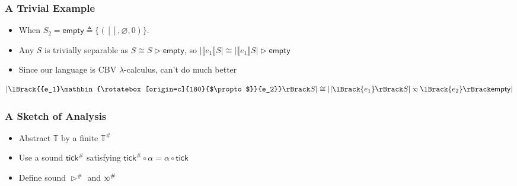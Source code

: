 \documentclass{beamer}
\newcommand*{\A}[1]{{#1}^{\#}}
\newcommand*{\Time}{\mathbb{T}}
\newcommand*{\semlink}{\mathbin{\rotatebox[origin=c]{180}{$\propto$}}}
\newcommand*{\link}[2]{{#1}\semlink{#2}}
\newcommand*{\mt}{\mathsf{empty}}
\newcommand*{\sembracket}[1]{\lBrack{#1}\rBrack}
\newcommand*{\tick}{\mathsf{tick}}
\begin{document}
\begin{frame}[c]
  \frametitle{A Trivial Example}
  \begin{itemize}
    \item When $S_2=\mt\triangleq\{([],\varnothing,0)\}$.
    \item Any $S$ is trivially separable as $S\cong S\rhd\mt$, so $|\sembracket{e_1}S|\cong|\sembracket{e_1}S|\rhd\mt$
    \item Since our language is CBV $\lambda$-calculus, can't do much better
  \end{itemize}
  \begin{corollary}
    \[
      |\sembracket{\link{e_1}{e_2}}S|\cong||\sembracket{e_1}S|\semlink\sembracket{e_2}\mt|
    \]
  \end{corollary}
\end{frame}
\begin{frame}[c]
  \frametitle{A Sketch of Analysis}
  \begin{itemize}
    \item Abstract $\Time$ by a finite $\A\Time$
    \item Use a sound $\A\tick$ satisfying $\A\tick\circ\alpha=\alpha\circ\tick$
    \item Define sound $\A\rhd$ and $\A\semlink$
  \end{itemize}
\end{frame}
\end{document}

